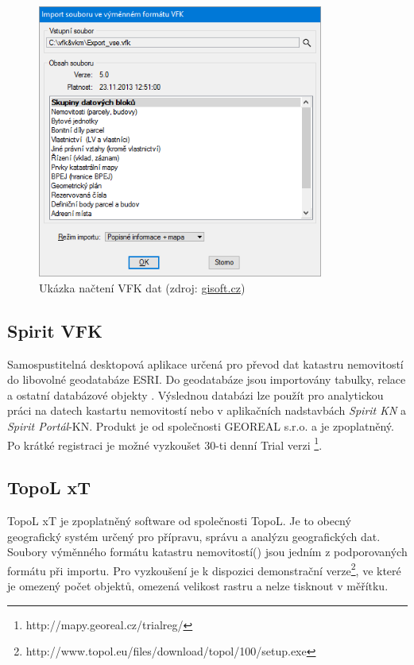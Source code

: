 \begin{figure}[H]
	 \centering
      \includegraphics[height=9cm]{./pictures/gisoft.png}
      \caption{Ukázka načtení VFK dat (zdroj:
\href{http://www.gisoft.cz/cze/files/Moduly/import-vfk.png}{gisoft.cz})}
      \label{fig:gisoft}
  \end{figure}
\subsection{Spirit VFK}
Samospustitelná desktopová aplikace určená pro převod dat katastru
nemovitostí do libovolné geodatabáze ESRI. Do geodatabáze jsou
importovány tabulky, relace a ostatní databázové objekty
. Výslednou databázi lze použít pro analytickou práci na
datech kastartu nemovitostí nebo v aplikačních nadstavbách
\textit{Spirit KN} a \textit{Spirit Portál}-KN. Produkt je od
společnosti GEOREAL s.r.o. a je zpoplatněný. Po krátké registraci je
možné vyzkoušet 30-ti denní Trial
verzi \footnote{http://mapy.georeal.cz/trialreg/}.\cite{spirit_vfk}
\subsection{TopoL xT}
TopoL xT je zpoplatněný software od společnosti TopoL. Je to obecný
geografický systém určený pro přípravu, správu a analýzu geografických
dat. Soubory výměnného formátu katastru nemovitostí() jsou
jedním z podporovaných formátu při importu. Pro vyzkoušení je k
dispozici demonstrační
verze\footnote{http://www.topol.eu/files/download/topol/100/setup.exe},
ve které je omezený počet objektů, omezená velikost rastru a nelze
tisknout v měřítku.\citep{topol}

